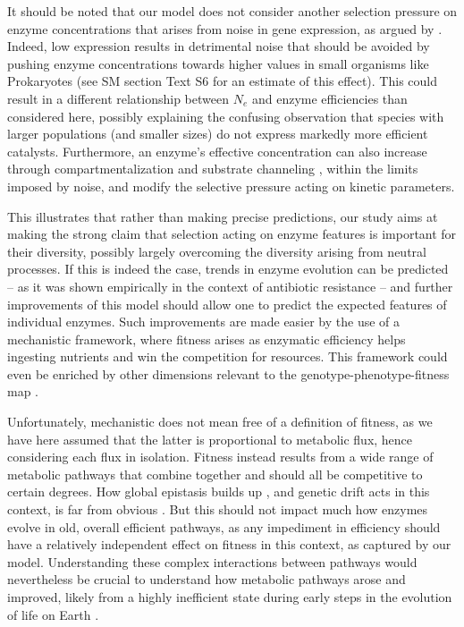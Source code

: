 It should be noted that our model does not consider another selection pressure on enzyme concentrations that arises from noise in gene expression, as argued by \citet{Wang11}. Indeed, low expression results in detrimental noise that should be avoided by pushing enzyme concentrations towards higher values in small organisms like Prokaryotes (see SM section Text S6 for an estimate of this effect). This could result in a different relationship between $N_e$ and enzyme efficiencies than considered here, possibly explaining the confusing observation that species with larger populations (and smaller sizes) do not express markedly more efficient catalysts. Furthermore, an enzyme's effective concentration can also increase through compartmentalization \citep{Ovadi04,Diekmann13,Cornejo14} and substrate channeling \citep{Welch94,Huang01,Sweetlove18}, within the limits imposed by noise, and modify the selective pressure acting on kinetic parameters.

This illustrates that rather than making precise predictions, our study aims at making the strong claim that selection acting on enzyme features is important for their diversity, possibly largely overcoming the diversity arising from neutral processes. If this is indeed the case, trends in enzyme evolution can be predicted -- as it was shown empirically in the context of antibiotic resistance \citep{Walkiewicz12} -- and further improvements of this model should allow one to predict the expected features of individual enzymes. Such improvements are made easier by the use of a mechanistic framework, where fitness arises as enzymatic efficiency helps ingesting nutrients and win the competition for resources. This framework could even be enriched by other dimensions relevant to the genotype-phenotype-fitness map \citep{Bershtein17,Echave19,Kinsler20}. 

Unfortunately, mechanistic does not mean free of a definition of fitness, as we have here assumed that the latter is proportional to metabolic flux, hence considering each flux in isolation. Fitness instead results from a wide range of metabolic pathways that combine together and should all be competitive to certain degrees. How global epistasis builds up \citep{Weinreich13,Otwinowski18,Reddy20}, and genetic drift acts in this context, is far from obvious \citep{Iwasa04,Weinreich05,Weissman09}. But this should not impact much how enzymes evolve in old, overall efficient pathways, as any impediment in efficiency should have a relatively independent effect on fitness in this context, as captured by our model. Understanding these complex interactions between pathways would nevertheless be crucial to understand how metabolic pathways arose and improved, likely from a highly inefficient state during early steps in the evolution of life on Earth \citep{Kacser84,Schmidt03,Heckmann18}.


